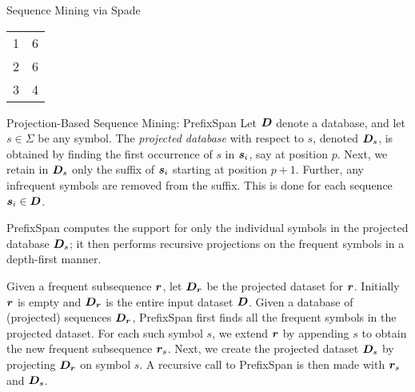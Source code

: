 \begin{frame}{Sequence Mining via Spade}
{{\begin{tabular}{|c|c|}
        1 & 6\\
        2 & 6\\
        3 & 4\\
        \hline
    \end{tabular}}
  }
  \centerline{
  }
\end{frame}

\ifdefined\wox \begin{frame} \titlepage \end{frame} \fi

\begin{frame}{Projection-Based Sequence Mining: Pref\/{i}xSpan}
Let ${\boldsymbol D}$ denote a database, and let $s \in \Sigma$ be any
symbol. The {\em projected database} with respect to $s$, denoted
${\boldsymbol D}_s$, is obtained by f\/{i}nding the
f\/{i}rst occurrence of $s$ in ${\boldsymbol s}_i$, say at position $p$. Next,
we retain in ${\boldsymbol D}_s$ only the suff\/{i}x of ${\boldsymbol s}_i$
starting at position $p+1$.  Further, any infrequent
symbols are removed from the suff\/{i}x.
This is done for each sequence
${\boldsymbol s}_i \in {\boldsymbol D}$.

\medskip
Pref\/{i}xSpan computes the support for only the
individual symbols in the projected database ${\boldsymbol D}_s$; it then
performs recursive projections on the
frequent symbols in a depth-f\/{i}rst manner. 

\medskip
Given a frequent subsequence ${\boldsymbol r}$, let ${\boldsymbol D}_{\boldsymbol r}$ be the projected
dataset for ${\boldsymbol r}$. Initially ${\boldsymbol r}$ is empty and ${\boldsymbol D}_{\boldsymbol r}$ is the entire
input dataset ${\boldsymbol D}$.
Given a database of (projected) sequences ${\boldsymbol D}_{\boldsymbol r}$,
Pref\/{i}xSpan f\/{i}rst f\/{i}nds all the frequent symbols in the projected
dataset. For each such symbol $s$, we extend ${\boldsymbol r}$ by appending $s$
to obtain the new frequent subsequence ${\boldsymbol r}_s$. Next, we create the
projected dataset ${\boldsymbol D}_s$ by projecting ${\boldsymbol D}_{\boldsymbol r}$ on
symbol $s$. A recursive call to Pref\/{i}xSpan is
then made with ${\boldsymbol r}_s$ and ${\boldsymbol D}_s$.
\end{frame}


